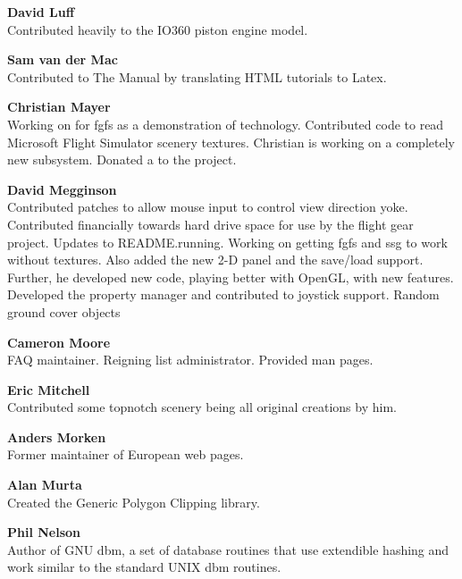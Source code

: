 \noindent \textbf{David Luff}\\
 Contributed heavily to the IO360 piston engine model.
 \medskip

\noindent \textbf{Sam van der Mac}\\
 Contributed to The Manual by translating HTML tutorials to Latex.
 \medskip

\noindent \textbf{Christian Mayer}\\
 Working on  for fgfs as a demonstration of technology.
 Contributed code to read Microsoft Flight Simulator scenery textures. Christian is working on a completely new  subsystem.
 Donated a  to the project.
 \medskip

\noindent \textbf{David Megginson}\\
  Contributed patches to allow mouse input to control view direction yoke.
  Contributed financially towards hard drive space for use by the
  flight gear project. Updates to README.running.
  Working on getting fgfs and ssg to work without textures.
  Also added the new 2-D panel and the save/load support.
  Further, he developed new  code, playing better with OpenGL, with new features.
  Developed the property manager and contributed to joystick support.
  Random ground cover objects
 \medskip

 \medskip

\noindent \textbf{Cameron Moore}\\
 FAQ maintainer. Reigning list administrator. Provided man pages.
 \medskip

\noindent \textbf{Eric Mitchell}\\
  Contributed some topnotch scenery  being all original creations by him.
 \medskip

\noindent \textbf{Anders Morken}\\
  Former maintainer of European web pages.
  \medskip

\noindent \textbf{Alan Murta}\\
  Created the Generic Polygon Clipping library.
 \medskip

   \medskip

\noindent \textbf{Phil Nelson}\\
  Author of GNU dbm, a set of database routines that use extendible hashing and work
  similar to the standard UNIX dbm routines.
  \medskip

